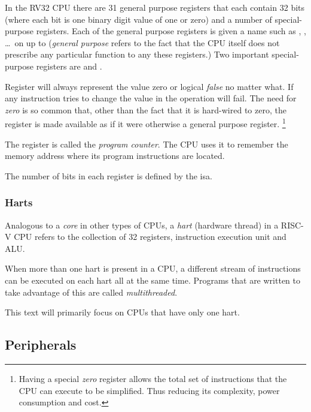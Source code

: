 In the RV32 CPU there are 31 general purpose registers that each contain 32 \gls{bit}s 
(where each bit is one \gls{binary} digit value of one or zero) and a number 
of special-purpose registers.
Each of the general purpose registers is given a name such as , ,
\ldots\ on up to  ({\em general purpose} refers to the fact that the CPU 
itself does not prescribe any particular function to any these registers.)
Two important special-purpose registers are  and .

Register  will always represent the value zero or logical {\em false}  
no matter what.  If any instruction tries to change the value in  the 
operation will fail.  The need for {\em zero} is so common that, other than the 
fact that it is hard-wired to zero, the  register is made available as 
if it were otherwise a general purpose register.%
\footnote{Having a special 
{\em zero} register allows the total set of instructions that the CPU can execute 
to be simplified.  Thus reducing its complexity, power consumption and cost.} 

The  register is called the {\em program counter}.  The CPU uses it to
remember the memory address where its program instructions are located.

%
The number of bits in each register is defined by the \acrfull{isa}.

\subsubsection{Harts}

Analogous to a {\em core} in other types of CPUs, a {\em \acrshort{hart}} 
(hardware \gls{thread}) in a RISC-V CPU refers to the collection of 32 registers,
instruction execution unit and ALU.\cite[p.~20]{rvismv1v22:2017}

When more than one hart is present in a CPU, a different stream of instructions can 
be executed on each hart all at the same time.
Programs that are written to take advantage of this are called {\em multithreaded}.

This text will primarily focus on CPUs that have only one hart.

\subsection{Peripherals}


